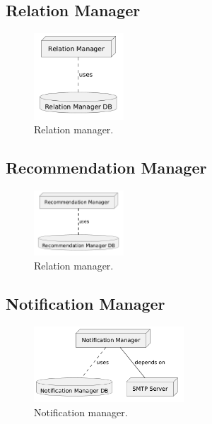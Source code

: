 \subsection{Relation Manager}

\begin{figure}[H]
    \centering
    \includegraphics[width=0.3\textwidth]{dd/assets/componen-itntegration-diagram/3-relation-manager.png}
    \caption{Relation manager.}
    \label{fig:Relation manager}
\end{figure}

\subsection{Recommendation Manager}
\begin{figure}[H]
    \centering
    \includegraphics[width=0.3\textwidth]{dd/assets/componen-itntegration-diagram/4-recommendation-service.png}
    \caption{Relation manager.}
    \label{fig:Relation manager}
\end{figure}

\subsection{Notification Manager}
\begin{figure}[H]
    \centering
    \includegraphics[width=0.5\textwidth]{dd/assets/componen-itntegration-diagram/5-notification-manager.png}
    \caption{Notification manager.}
    \label{fig:Notification manager}
\end{figure}

